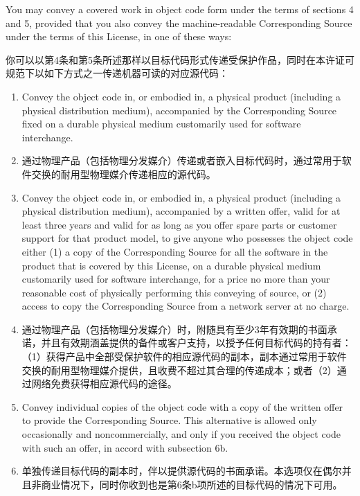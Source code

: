 \documentclass[11pt]{article}
\begin{document}
\begin{enumerate}
You may convey a covered work in object code form under the terms
of sections 4 and 5, provided that you also convey the
machine-readable Corresponding Source under the terms of this License,
in one of these ways:

你可以以第4条和第5条所述那样以目标代码形式传递受保护作品，同时在本许证可规范下以如下方式之一传递机器可读的对应源代码：

  \begin{enumerate}
  \item Convey the object code in, or embodied in, a physical product
  (including a physical distribution medium), accompanied by the
  Corresponding Source fixed on a durable physical medium
  customarily used for software interchange.

  \item 通过物理产品（包括物理分发媒介）传递或者嵌入目标代码时，通过常用于软件交换的耐用型物理媒介传递相应的源代码。
  
  \item Convey the object code in, or embodied in, a physical product
  (including a physical distribution medium), accompanied by a
  written offer, valid for at least three years and valid for as
  long as you offer spare parts or customer support for that product
  model, to give anyone who possesses the object code either (1) a
  copy of the Corresponding Source for all the software in the
  product that is covered by this License, on a durable physical
  medium customarily used for software interchange, for a price no
  more than your reasonable cost of physically performing this
  conveying of source, or (2) access to copy the
  Corresponding Source from a network server at no charge.

  \item 通过物理产品（包括物理分发媒介）时，附随具有至少3年有效期的书面承诺，并且有效期涵盖提供的备件或客户支持，以授予任何目标代码的持有者：（1）获得产品中全部受保护软件的相应源代码的副本，副本通过常用于软件交换的耐用型物理媒介提供，且收费不超过其合理的传递成本；或者（2）通过网络免费获得相应源代码的途径。

  \item Convey individual copies of the object code with a copy of the
  written offer to provide the Corresponding Source.  This
  alternative is allowed only occasionally and noncommercially, and
  only if you received the object code with such an offer, in accord
  with subsection 6b.

  \item 单独传递目标代码的副本时，伴以提供源代码的书面承诺。本选项仅在偶尔并且非商业情况下，同时你收到也是第6条b项所述的目标代码的情况下可用。
  

\end{enumerate}
\end{enumerate}
\end{document}
